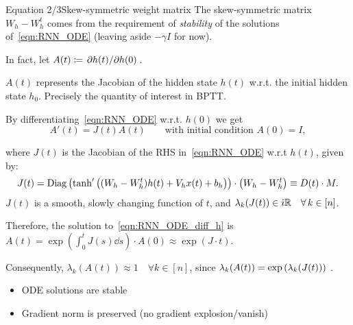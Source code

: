 \documentclass[10pt,xcolor={table,dvipsnames}]{beamer} 		%
\theoremstyle{plain}					%
\theoremstyle{definition}
\theoremstyle{remark}
\newcommand{\Diag}[1]{\operatorname{Diag}\left(#1\right)}
\newcommand{\iu}{\dot{\imath}}
\begin{document}
	\begin{frame}{Equation 2/3}{Skew-symmetric weight matrix}
		The skew-symmetric matrix $W_h-W_h^t$ comes from the requirement of \emph{stability}
		of the solutions of~\eqref{eqn:RNN_ODE} {\smaller (leaving aside $-\gamma I$ for now)}.
		\medskip

		In fact, let $A(t)\coloneqq\pdv*{h(t)}{h(0)}$.
		\begin{block}{}
			$A(t)$ represents the Jacobian of the hidden state $h(t)$ w.r.t. the initial 
			hidden state $h_0$. Precisely the quantity of interest in BPTT.
		\end{block}
		By differentiating~\eqref{eqn:RNN_ODE} w.r.t. $h(0)$ we get
		\begin{equation}\label{eqn:RNN_ODE_diff_h}
			A'(t)=J(t)A(t)\qquad\text{with initial condition }A(0)=I,
		\end{equation}

		where $J(t)$ is the Jacobian of the RHS in~\eqref{eqn:RNN_ODE} w.r.t $h(t)$, given by:
		\[
			J(t)=\Diag{\tanh'\qty((W_h-W_h^t)h(t)+V_hx(t)+b_h)}\cdot\qty(W_h-W_h^t)\equiv D(t)\cdot M.
		\]
		$J(t)$ is a smooth, slowly changing function of $t$, and 
		$\lambda_k\qty(J(t))\in \iu\R\quad\forall\,k\in [n]$.
		\smallskip 
		
		Therefore, the solution to~\eqref{eqn:RNN_ODE_diff_h} is 
		$A(t)=\exp(\int_0^t J(s)\dd{s})\cdot A(0)\approx\exp(J\cdot t)$.

		Consequently, $\lambda_k(A(t))\approx 1\quad\forall k\in[n]$, 
		since $\lambda_k(A(t))=\exp\qty(\lambda_k\qty(J(t)))$%
		.

		\begin{itemize}
			\item ODE solutions are \alert{stable}
			\item Gradient norm is preserved {\smaller (no gradient explosion/vanish)}
		\end{itemize} 
	\end{frame}
\end{document}
